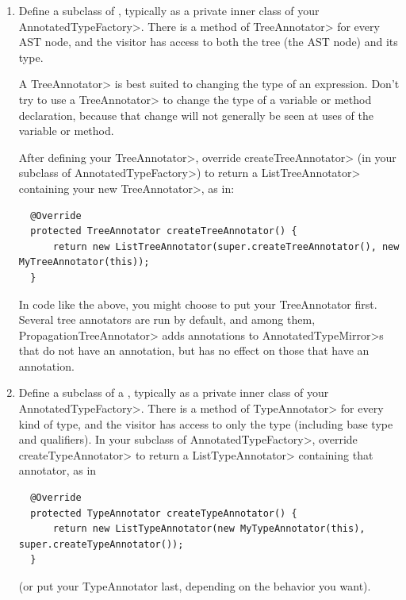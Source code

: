 \begin{enumerate}
\item
  Define a subclass of
  ,
  typically as a private inner class of your \<AnnotatedTypeFactory>.
  There is a method of \<TreeAnnotator> for every AST node, and the visitor
  has access to both the tree (the AST node) and its type.

  A \<TreeAnnotator> is best suited to changing the type of an expression.
  Don't try to use a \<TreeAnnotator> to change the type of a variable or
  method declaration, because that change will not generally be seen at
  uses of the variable or method.

  After defining your \<TreeAnnotator>, override \<createTreeAnnotator> (in
  your subclass of \<AnnotatedTypeFactory>) to return a
  \<ListTreeAnnotator> containing your new \<TreeAnnotator>, as in:

\begin{Verbatim}
  @Override
  protected TreeAnnotator createTreeAnnotator() {
      return new ListTreeAnnotator(super.createTreeAnnotator(), new MyTreeAnnotator(this));
  }
\end{Verbatim}

  \noindent
  In code like the above, you might choose to put your TreeAnnotator first.
  Several tree annotators are run by
  default, and among them, \<PropagationTreeAnnotator>
  adds annotations to \<AnnotatedTypeMirror>s that do not have an annotation,
  but has no effect on those that have an annotation.

\item
  Define a subclass of a
  ,
  typically as a private inner class of your \<AnnotatedTypeFactory>.
  There is a method of \<TypeAnnotator> for every kind of type, and the
  visitor has access to only the type (including base type and
  qualifiers).  In your subclass of
  \<AnnotatedTypeFactory>, override \<createTypeAnnotator> to return a
  \<ListTypeAnnotator> containing that annotator, as in

\begin{Verbatim}
  @Override
  protected TypeAnnotator createTypeAnnotator() {
      return new ListTypeAnnotator(new MyTypeAnnotator(this), super.createTypeAnnotator());
  }
\end{Verbatim}

  \noindent
  (or put your TypeAnnotator last, depending on the behavior you want).


\end{enumerate}

